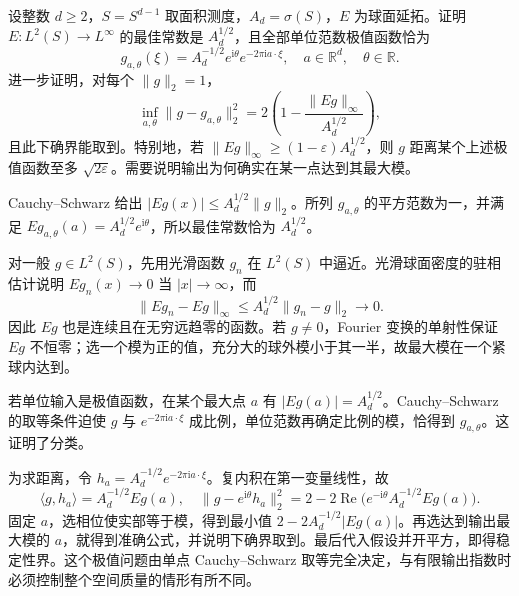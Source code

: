 \begin{optionalexercise}\label{b2:ex:23-new-7}
设整数 \(d\geq2\)，\(S=S^{d-1}\) 取面积测度，\(A_d=\sigma(S)\)，\(E\) 为球面延拓。证明 \(E:L^2(S)\to L^\infty\) 的最佳常数是 \(A_d^{1/2}\)，且全部单位范数极值函数恰为
\[
 g_{a,\theta}(\xi)=A_d^{-1/2}e^{\mathrm i\theta}e^{-2\pi\mathrm i a\cdot\xi},
 \quad a\in\mathbb R^d,\quad\theta\in\mathbb R.
\]
进一步证明，对每个 \(\|g\|_2=1\)，
\[
 \inf_{a,\theta}\|g-g_{a,\theta}\|_2^2
 =2\left(1-\frac{\|Eg\|_\infty}{A_d^{1/2}}\right),
\]
且此下确界能取到。特别地，若 \(\|Eg\|_\infty\geq(1-\varepsilon)A_d^{1/2}\)，则 \(g\) 距离某个上述极值函数至多 \(\sqrt{2\varepsilon}\)。需要说明输出为何确实在某一点达到其最大模。
\end{optionalexercise}
\begin{solution}
Cauchy--Schwarz 给出 \(|Eg(x)|\leq A_d^{1/2}\|g\|_2\)。所列 \(g_{a,\theta}\) 的平方范数为一，并满足
\(Eg_{a,\theta}(a)=A_d^{1/2}e^{\mathrm i\theta}\)，所以最佳常数恰为 \(A_d^{1/2}\)。

对一般 \(g\in L^2(S)\)，先用光滑函数 \(g_n\) 在 \(L^2(S)\) 中逼近。光滑球面密度的驻相估计说明 \(Eg_n(x)\to0\) 当 \(|x|\to\infty\)，而
\[
 \|Eg_n-Eg\|_\infty\leq A_d^{1/2}\|g_n-g\|_2\longrightarrow0.
\]
因此 \(Eg\) 也是连续且在无穷远趋零的函数。若 \(g\ne0\)，Fourier 变换的单射性保证 \(Eg\) 不恒零；选一个模为正的值，充分大的球外模小于其一半，故最大模在一个紧球内达到。

若单位输入是极值函数，在某个最大点 \(a\) 有 \(|Eg(a)|=A_d^{1/2}\)。Cauchy--Schwarz 的取等条件迫使 \(g\) 与 \(e^{-2\pi\mathrm i a\cdot\xi}\) 成比例，单位范数再确定比例的模，恰得到 \(g_{a,\theta}\)。这证明了分类。

为求距离，令 \(h_a=A_d^{-1/2}e^{-2\pi\mathrm i a\cdot\xi}\)。复内积在第一变量线性，故
\[
 \langle g,h_a\rangle=A_d^{-1/2}Eg(a),
 \quad
 \|g-e^{\mathrm i\theta}h_a\|_2^2
 =2-2\operatorname{Re}\bigl(e^{-\mathrm i\theta}A_d^{-1/2}Eg(a)\bigr).
\]
固定 \(a\)，选相位使实部等于模，得到最小值
\(2-2A_d^{-1/2}|Eg(a)|\)。再选达到输出最大模的 \(a\)，就得到准确公式，并说明下确界取到。最后代入假设并开平方，即得稳定性界。这个极值问题由单点 Cauchy--Schwarz 取等完全决定，与有限输出指数时必须控制整个空间质量的情形有所不同。
\end{solution}

